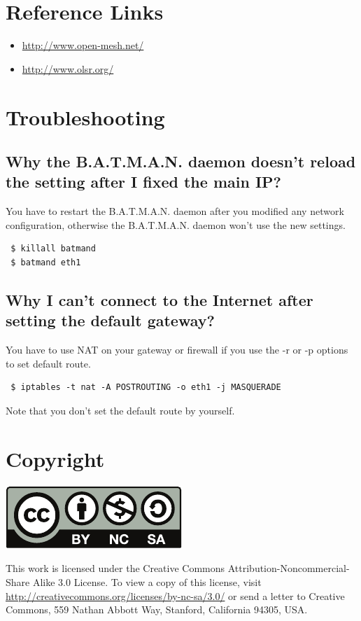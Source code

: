 \documentclass[
	12pt,
	a4paper,
	twoside,
	english,
	headsepline,
	footnosepline,
	automark,
	normalheadings,
	openany,
	cleardoubleplain,
	abstracton,
	idxtotoc,
	liststotoc,
	bibtotoc,
 	BCOR8mm,
]{scrartcl}
\begin{document}
\section{Reference Links}
\begin{itemize}
\item \url{http://www.open-mesh.net/}
\item \url{http://www.olsr.org/}
\end{itemize}

\section{Troubleshooting}
\subsection{Why the B.A.T.M.A.N. daemon doesn't reload the setting after I fixed the main IP?}
You have to restart the B.A.T.M.A.N. daemon after you modified any network
configuration, otherwise the B.A.T.M.A.N. daemon won't use the new settings.
\begin{verbatim}
 $ killall batmand
 $ batmand eth1
\end{verbatim}

\subsection{Why I can't connect to the Internet after setting the default gateway?}
You have to use NAT on your gateway or firewall if you use the -r or -p options
to set default route.
\begin{verbatim}
 $ iptables -t nat -A POSTROUTING -o eth1 -j MASQUERADE
\end{verbatim}
Note that you don't set the default route by yourself.

\vfill
\section*{Copyright}
\begin{center}
 \includegraphics[scale=0.5]{img/by-nc-sa}
\end{center}
This work is licensed under the Creative Commons Attribution-Noncommercial-Share
Alike 3.0 License. To view a copy of this license, visit
\url{http://creativecommons.org/licenses/by-nc-sa/3.0/} or send a letter to
Creative Commons, 559 Nathan Abbott Way, Stanford, California 94305, USA.
\end{document}
